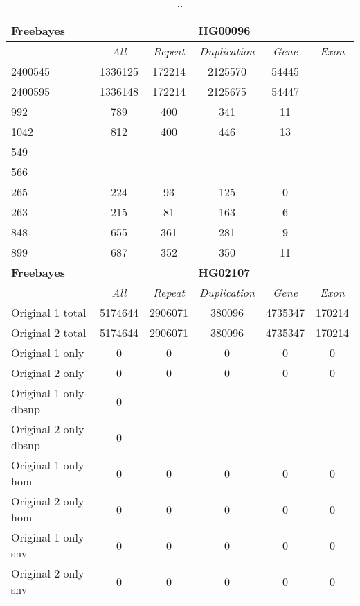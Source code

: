 \begin{table}[htb]
\begin{center}
\begin{tabular}{|l|c||c|c|c|c|}
\hline
{\bf Freebayes} & \multicolumn{5}{|c|}{\bf HG00096} \\
\hline
\cline{2-6}
{\bf} & {\it All} & {\it Repeat} & {\it Duplication} & {\it Gene} & {\it Exon} \\
\hline
2400545 & 1336125 & 172214 & 2125570 & 54445\\ 
\hline
2400595 & 1336148 & 172214 & 2125675 & 54447\\ 
\hline
992 & 789 & 400 & 341 & 11\\ 
\hline
1042 & 812 & 400 & 446 & 13\\ 
\hline
549 &  &  &  & \\ 
\hline
566 &  &  &  & \\ 
\hline
265 & 224 & 93 & 125 & 0\\ 
\hline
263 & 215 & 81 & 163 & 6\\ 
\hline
848 & 655 & 361 & 281 & 9\\ 
\hline
899 & 687 & 352 & 350 & 11\\ 
\hline
\hline
{\bf Freebayes} & \multicolumn{5}{|c|}{\bf HG02107} \\
\hline
\cline{2-6}
{\bf} & {\it All} & {\it Repeat} & {\it Duplication} & {\it Gene} & {\it Exon} \\
\hline
Original 1 total & 5174644 & 2906071 & 380096 & 4735347 & 170214\\ 
\hline
Original 2 total & 5174644 & 2906071 & 380096 & 4735347 & 170214\\ 
\hline
Original 1 only & 0 & 0 & 0 & 0 & 0\\ 
\hline
Original 2 only & 0 & 0 & 0 & 0 & 0\\ 
\hline
Original 1 only dbsnp & 0 &  &  &  & \\ 
\hline
Original 2 only dbsnp & 0 &  &  &  & \\ 
\hline
Original 1 only hom & 0 & 0 & 0 & 0 & 0\\ 
\hline
Original 2 only hom & 0 & 0 & 0 & 0 & 0\\ 
\hline
Original 1 only snv & 0 & 0 & 0 & 0 & 0\\ 
\hline
Original 2 only snv & 0 & 0 & 0 & 0 & 0\\ 
\hline
\end{tabular}
\end{center}
\caption{ .. }
\label{tab:orig-vs-shuf-freebayes}
\end{table}

